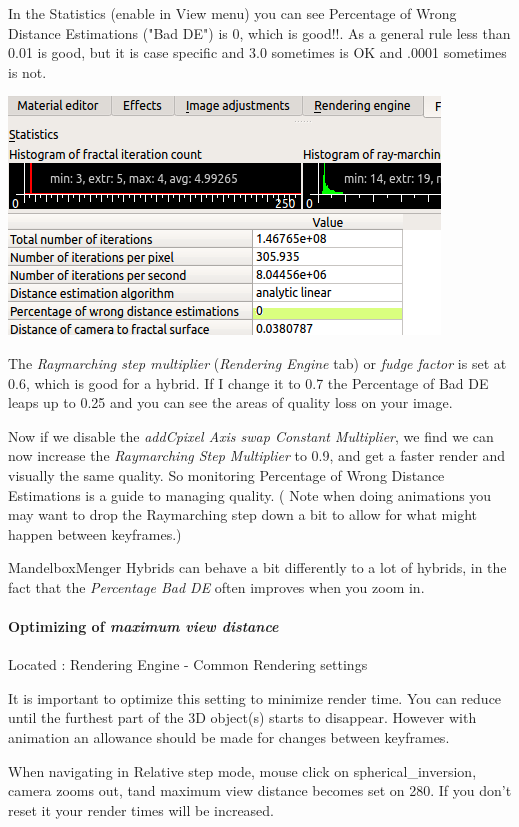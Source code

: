 In the Statistics (enable in View menu) you can see Percentage of Wrong Distance
Estimations ("Bad DE") is 0, which is good!!. As a general rule less than 0.01
is good, but it is case specific and 3.0 sometimes is OK and .0001 sometimes is
not.

\includegraphics[width=0.5\linewidth]{img/manual/media/mandelboxmenger_statistics.png}

The \emph{Raymarching step multiplier} (\emph{Rendering Engine} tab) or
\emph{fudge factor} is set at 0.6, which is good for a hybrid. If I change it to
0.7 the Percentage of Bad DE leaps up to 0.25 and you can see the areas of
quality loss on your image.

Now if we disable the \emph{addCpixel Axis swap Constant Multiplier}, we find we
can now increase the \emph{Raymarching Step Multiplier} to 0.9, and get a faster
render and visually the same quality. So monitoring Percentage of Wrong Distance
Estimations is a guide to managing quality. ( Note when doing animations you may
want to drop the Raymarching step down a bit to allow for what might happen
between keyframes.)

MandelboxMenger Hybrids can behave a bit differently to a lot of hybrids, in the
fact that the \emph{Percentage Bad DE} often improves when you zoom in.

\paragraph{Optimizing of \emph{maximum view distance}} Located : Rendering
Engine - Common Rendering settings

It is important to optimize this setting to minimize render time. You can reduce
until the furthest part of the 3D object(s) starts to disappear. However with
animation an allowance should be made for changes between keyframes.

\begin{notebox}[Note] When navigating in Relative step mode, mouse click on
	spherical\_inversion, camera zooms out, tand maximum view distance becomes set
	on 280. If you don't reset it your render times will be increased. \end{notebox}

